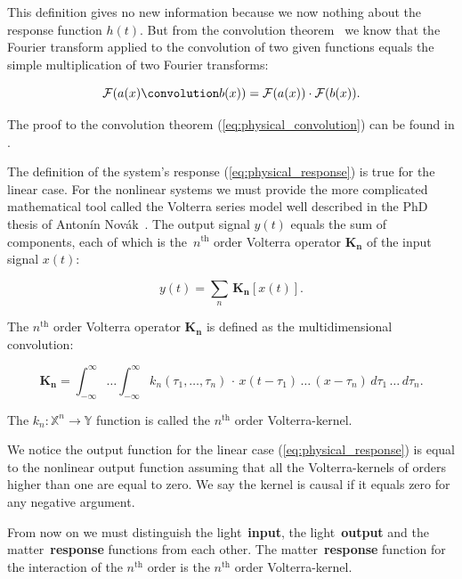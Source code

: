 \documentclass[12pt,twoside,a4paper]{article}
\numberwithin{equation}{subsection}
\numberwithin{figure}{subsection}
\begin{document}
This definition gives no new information because we now nothing about the response function $ h(t) $. But from the convolution
theorem~\cite{katznelson_introduction} we know that the Fourier transform applied to the convolution of two given functions equals the
simple multiplication of two Fourier transforms:

\begin{equation} \label{eq:physical_convolution}
  \mathcal{F}(a(x) \convolution b(x)) = \mathcal{F}(a(x)) \cdot \mathcal{F}(b(x)) .
\end{equation}

The proof to the convolution theorem (\ref{eq:physical_convolution}) can be found in \cite{titchmarsh_introduction}.

The definition of the system's response (\ref{eq:physical_response}) is true for the linear case. For the nonlinear systems we must provide
the more complicated mathematical tool called the Volterra series model well described in the PhD thesis of Antonín
Novák~\cite{thesis_novak}. The output signal $ y(t) $ equals the sum of components, each of which is the~$ n ^ {\text{th}} $ order Volterra
operator $ \mathbf{K_n} $ of the input signal $ x(t) $:

\begin{equation} \label{eq:physical_volterraseries}
  y(t) = \sum_{n} \, \mathbf{K_n}[x (t) ].
\end{equation}

The $ n ^ {\text{th}} $ order Volterra operator $ \mathbf{K_n} $ is defined as the multidimensional convolution:

\begin{equation} \label{eq:physical_volterraoperator}
  \mathbf{K_n} = \int_{ - \infty}^{\infty} \ldots \int_{ - \infty}^{\infty} k_n (\tau_1, \ldots, \tau_n) \, \cdot \, x(t - \tau_1) \, \ldots
  \, (x - \tau_n)\, d\tau_1 \, \ldots \, d\tau_n .
\end{equation}

The $ k_n : \mathbb{X}^{n} \rightarrow \mathbb{Y} $ function is called the $ n ^ {\text{th}} $ order Volterra-kernel. 

We notice the output function for the linear case (\ref{eq:physical_response}) is equal to the nonlinear output function assuming that all
the Volterra-kernels of orders higher than one are equal to zero. We say the kernel is causal if it equals zero for any negative
argument.

From now on we must distinguish the light~\textbf{input}, the light~\textbf{output} and the matter~\textbf{response} functions from each
other. The matter~\textbf{response} function for the interaction of the $ n^{\text{th}} $ order is the $ n^{\text{th}} $ order
Volterra-kernel.
\end{document}
